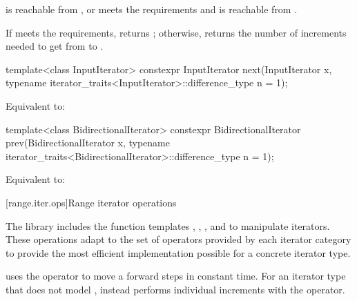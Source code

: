\begin{itemdescr}
\pnum
\expects
{} is reachable from , or
 meets
the  requirements and
 is reachable from .

\pnum
\effects
If  meets the  requirements,
returns ; otherwise, returns
the number of increments needed to get from
to
.
\end{itemdescr}

%
\begin{itemdecl}
template<class InputIterator>
  constexpr InputIterator next(InputIterator x,
    typename iterator_traits<InputIterator>::difference_type n = 1);
\end{itemdecl}

\begin{itemdescr}
\pnum
\effects
Equivalent to: 
\end{itemdescr}

%
\begin{itemdecl}
template<class BidirectionalIterator>
  constexpr BidirectionalIterator prev(BidirectionalIterator x,
    typename iterator_traits<BidirectionalIterator>::difference_type n = 1);
\end{itemdecl}

\begin{itemdescr}
\pnum
\effects
Equivalent to: 
\end{itemdescr}

[range.iter.ops]{Range iterator operations}

\pnum
The library includes the function templates
, ,
, and 
to manipulate iterators. These operations adapt to the set of operators
provided by each iterator category to provide the most efficient implementation
possible for a concrete iterator type.
\begin{example}
 uses the \tcode{+} operator to move a
 forward  steps in constant time.
For an iterator type that does not model ,
 instead performs  individual increments with
the \tcode{++} operator.
\end{example}


